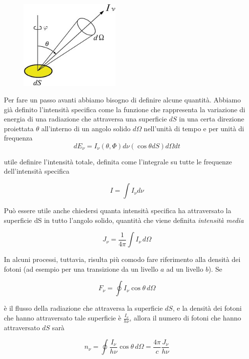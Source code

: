 \begin{minipage}{0.395\textwidth}
  \begin{figure}[H]
    \centering
    \includegraphics[width=5cm]{rappresentazione.jpg}
  \end{figure}
\end{minipage}
\begin{minipage}{0.6\textwidth}
  Per fare un passo avanti abbiamo bisogno di definire alcune quantità. Abbiamo già definito l'intensità specifica come la funzione che rappresenta la variazione di energia di una radiazione che attraversa una superficie $dS$ in una certa direzione proiettata $\theta$ all'interno di un angolo solido $d\Omega$ nell'unità di tempo e per unità di frequenza 
  $$dE_\nu=I_\nu(\theta,\Phi)d\nu (\cos\theta dS) d\Omega dt$$
\end{minipage}

\vspace{0.2cm}\E utile definire l'intensità totale, definita come l'integrale su tutte le frequenze dell'intensità specifica

$$I=\int I_\nu d\nu$$

Può essere utile anche chiedersi quanta intensità specifica ha attraversato la superficie dS in tutto l'angolo solido, quantità che viene definita \textit{intensità media}

$$J_\nu = \frac{1}{4\pi}\int I_\nu \, d\Omega$$

In alcuni processi, tuttavia, risulta più comodo fare riferimento alla densità dei fotoni (ad esempio per una transizione da un livello $a$ ad un livello $b$). Se

$$F_\nu=\oint I_\nu \cos\theta \, d\Omega$$

è il flusso della radiazione che attraversa la superficie $dS$, e la densità dei fotoni che hanno attraversato tale superficie è $\frac{I_\nu}{h\nu}$, allora il numero di fotoni che hanno attraversato $dS$ sarà

$$n_\nu = \oint \frac{I_\nu}{h\nu} \cos\theta \, d\Omega= \frac{4\pi}{c}\frac{J_\nu}{h\nu}$$

